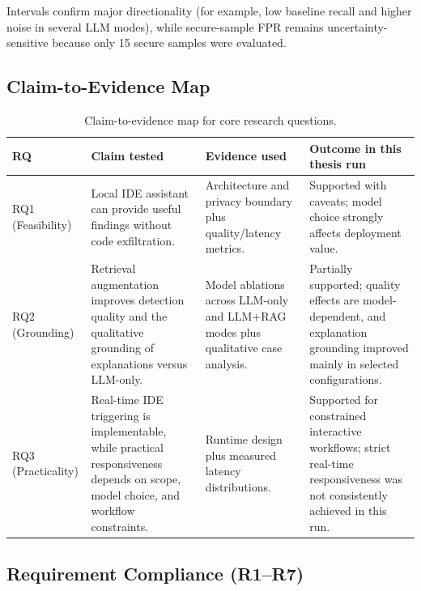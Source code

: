 Intervals confirm major directionality (for example, low baseline recall and higher noise in several LLM modes), while secure-sample FPR remains uncertainty-sensitive because only 15 secure samples were evaluated.

\subsection*{Claim-to-Evidence Map}

\begin{table}[H]
  \centering
  \caption{Claim-to-evidence map for core research questions.}
  \label{tab:claim-evidence-map}
  \footnotesize
  \renewcommand{\arraystretch}{1.15}
  \begin{tabularx}{\textwidth}{p{}p{}p{}X}
    \toprule
    RQ & Claim tested & Evidence used & Outcome in this thesis run \\
    \midrule
    RQ1 (Feasibility) & Local IDE assistant can provide useful findings without code exfiltration. & Architecture and privacy boundary plus quality/latency metrics. & Supported with caveats; model choice strongly affects deployment value. \\
    RQ2 (Grounding) & Retrieval augmentation improves detection quality and the qualitative grounding of explanations versus LLM-only. & Model ablations across LLM-only and LLM+RAG modes plus qualitative case analysis. & Partially supported; quality effects are model-dependent, and explanation grounding improved mainly in selected configurations. \\
    RQ3 (Practicality) & Real-time IDE triggering is implementable, while practical responsiveness depends on scope, model choice, and workflow constraints. & Runtime design plus measured latency distributions. & Supported for constrained interactive workflows; strict real-time responsiveness was not consistently achieved in this run. \\
    \bottomrule
  \end{tabularx}
\end{table}

\subsection*{Requirement Compliance (R1--R7)}

